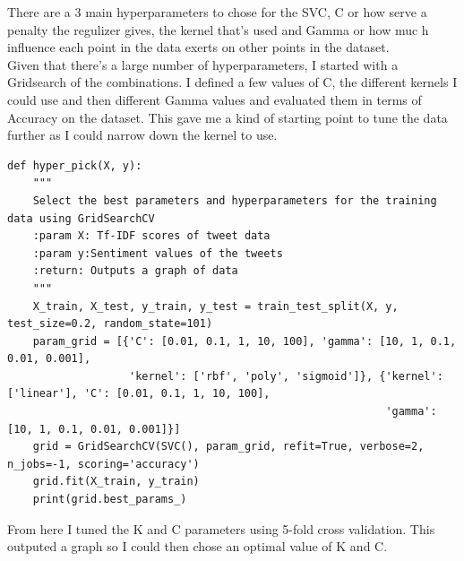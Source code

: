 \documentclass[11pt]{article} %
\begin{document}
There are a 3 main hyperparameters to chose for the SVC,  C or how serve a penalty the regulizer gives,  the kernel that's used and Gamma or how muc h influence each point in the data exerts on other points in the dataset. 
\\Given that there's a large number of hyperparameters,  I started with a Gridsearch of the combinations.  I defined a few values of C,  the different kernels I could use and then different Gamma values and evaluated them in terms of Accuracy on the dataset.  This gave me a kind of starting point to tune the data further as I could narrow down the kernel to use.  
\begin{verbatim}
def hyper_pick(X, y):
    """
    Select the best parameters and hyperparameters for the training data using GridSearchCV
    :param X: Tf-IDF scores of tweet data
    :param y:Sentiment values of the tweets
    :return: Outputs a graph of data
    """
    X_train, X_test, y_train, y_test = train_test_split(X, y, test_size=0.2, random_state=101)
    param_grid = [{'C': [0.01, 0.1, 1, 10, 100], 'gamma': [10, 1, 0.1, 0.01, 0.001],
                   'kernel': ['rbf', 'poly', 'sigmoid']}, {'kernel': ['linear'], 'C': [0.01, 0.1, 1, 10, 100],
                                                           'gamma': [10, 1, 0.1, 0.01, 0.001]}]
    grid = GridSearchCV(SVC(), param_grid, refit=True, verbose=2, n_jobs=-1, scoring='accuracy')
    grid.fit(X_train, y_train)
    print(grid.best_params_)
\end{verbatim}
From here I tuned the K and C parameters using 5-fold cross validation.  This outputed a graph so I could then chose an optimal value of K and C. 
\end{document}
